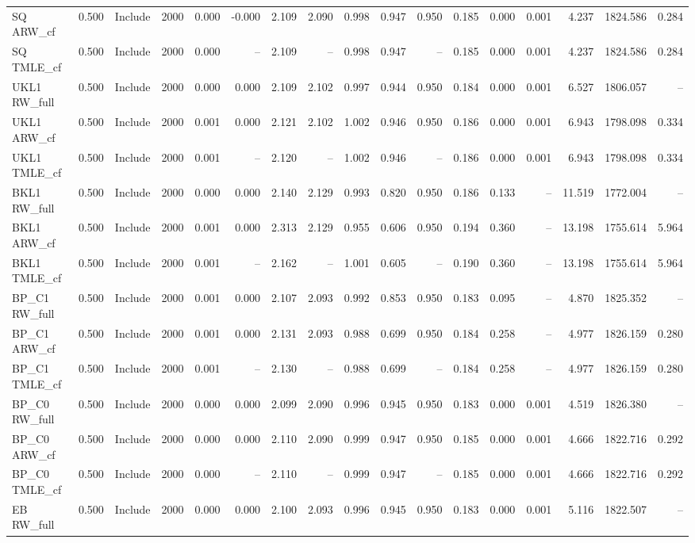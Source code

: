 \begin{tabular}{llllrrrrrrrrrrrrr}
SQ ARW\_cf & 0.500 & Include & 2000 & 0.000 & -0.000 & 2.109 & 2.090 & 0.998 & 0.947 & 0.950 & 0.185 & 0.000 & 0.001 & 4.237 & 1824.586 & 0.284 \\
SQ TMLE\_cf & 0.500 & Include & 2000 & 0.000 & -- & 2.109 & -- & 0.998 & 0.947 & -- & 0.185 & 0.000 & 0.001 & 4.237 & 1824.586 & 0.284 \\
UKL1 RW\_full & 0.500 & Include & 2000 & 0.000 & 0.000 & 2.109 & 2.102 & 0.997 & 0.944 & 0.950 & 0.184 & 0.000 & 0.001 & 6.527 & 1806.057 & -- \\
UKL1 ARW\_cf & 0.500 & Include & 2000 & 0.001 & 0.000 & 2.121 & 2.102 & 1.002 & 0.946 & 0.950 & 0.186 & 0.000 & 0.001 & 6.943 & 1798.098 & 0.334 \\
UKL1 TMLE\_cf & 0.500 & Include & 2000 & 0.001 & -- & 2.120 & -- & 1.002 & 0.946 & -- & 0.186 & 0.000 & 0.001 & 6.943 & 1798.098 & 0.334 \\
BKL1 RW\_full & 0.500 & Include & 2000 & 0.000 & 0.000 & 2.140 & 2.129 & 0.993 & 0.820 & 0.950 & 0.186 & 0.133 & -- & 11.519 & 1772.004 & -- \\
BKL1 ARW\_cf & 0.500 & Include & 2000 & 0.001 & 0.000 & 2.313 & 2.129 & 0.955 & 0.606 & 0.950 & 0.194 & 0.360 & -- & 13.198 & 1755.614 & 5.964 \\
BKL1 TMLE\_cf & 0.500 & Include & 2000 & 0.001 & -- & 2.162 & -- & 1.001 & 0.605 & -- & 0.190 & 0.360 & -- & 13.198 & 1755.614 & 5.964 \\
BP\_C1 RW\_full & 0.500 & Include & 2000 & 0.001 & 0.000 & 2.107 & 2.093 & 0.992 & 0.853 & 0.950 & 0.183 & 0.095 & -- & 4.870 & 1825.352 & -- \\
BP\_C1 ARW\_cf & 0.500 & Include & 2000 & 0.001 & 0.000 & 2.131 & 2.093 & 0.988 & 0.699 & 0.950 & 0.184 & 0.258 & -- & 4.977 & 1826.159 & 0.280 \\
BP\_C1 TMLE\_cf & 0.500 & Include & 2000 & 0.001 & -- & 2.130 & -- & 0.988 & 0.699 & -- & 0.184 & 0.258 & -- & 4.977 & 1826.159 & 0.280 \\
BP\_C0 RW\_full & 0.500 & Include & 2000 & 0.000 & 0.000 & 2.099 & 2.090 & 0.996 & 0.945 & 0.950 & 0.183 & 0.000 & 0.001 & 4.519 & 1826.380 & -- \\
BP\_C0 ARW\_cf & 0.500 & Include & 2000 & 0.000 & 0.000 & 2.110 & 2.090 & 0.999 & 0.947 & 0.950 & 0.185 & 0.000 & 0.001 & 4.666 & 1822.716 & 0.292 \\
BP\_C0 TMLE\_cf & 0.500 & Include & 2000 & 0.000 & -- & 2.110 & -- & 0.999 & 0.947 & -- & 0.185 & 0.000 & 0.001 & 4.666 & 1822.716 & 0.292 \\
EB RW\_full & 0.500 & Include & 2000 & 0.000 & 0.000 & 2.100 & 2.093 & 0.996 & 0.945 & 0.950 & 0.183 & 0.000 & 0.001 & 5.116 & 1822.507 & -- \\

\end{tabular}
